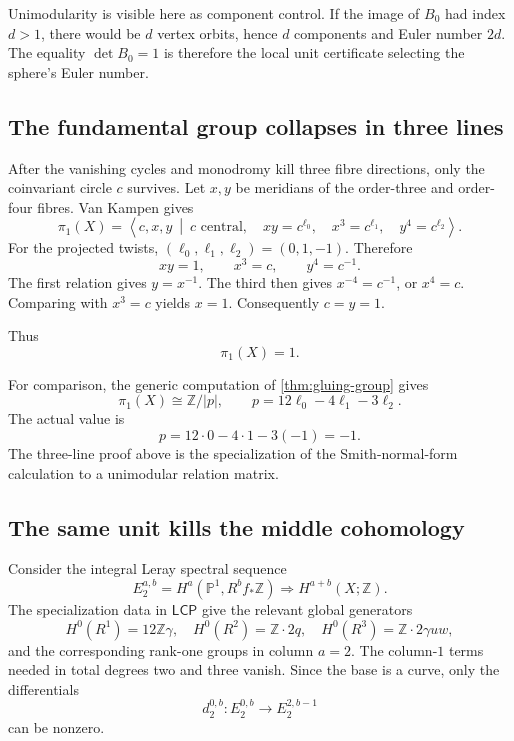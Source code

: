 \documentclass[11pt,reqno]{amsart}
\numberwithin{equation}{section}
\newcommand{\Z}{\mathbb Z}
\newcommand{\Pone}{\mathbb P^1}
\newcommand{\LCP}{\mathsf{LCP}}
\theoremstyle{definition}
\begin{document}
Unimodularity is visible here as component control. If the image of $B_0$ had index $d>1$, there would be $d$ vertex orbits, hence $d$ components and Euler number $2d$. The equality $\det B_0=1$ is therefore the local unit certificate selecting the sphere's Euler number.

\subsection{The fundamental group collapses in three lines}\label{sec:pi1}

After the vanishing cycles and monodromy kill three fibre directions, only the coinvariant circle $c$ survives. Let $x,y$ be meridians of the order-three and order-four fibres. Van Kampen gives
\begin{equation}\label{eq:presentation}
\pi_1(X)=
\left\langle c,x,y\ \middle|\
 c\text{ central},\quad
 xy=c^{\ell_0},\quad
 x^3=c^{\ell_1},\quad
 y^4=c^{\ell_2}
\right\rangle.
\end{equation}
For the projected twists, $(\ell_0,\ell_1,\ell_2)=(0,1,-1)$. Therefore
\[
xy=1,
\qquad x^3=c,
\qquad y^4=c^{-1}.
\]
The first relation gives $y=x^{-1}$. The third then gives $x^{-4}=c^{-1}$, or $x^4=c$. Comparing with $x^3=c$ yields $x=1$. Consequently $c=y=1$.

Thus
\begin{equation}\label{eq:pi1trivial}
\pi_1(X)=1.
\end{equation}

For comparison, the generic computation of \cref{thm:gluing-group} gives
\[
\pi_1(X)\cong\Z/|p|,
\qquad
p=12\ell_0-4\ell_1-3\ell_2.
\]
The actual value is
\begin{equation}\label{eq:pminusone}
p=12\cdot0-4\cdot1-3(-1)=-1.
\end{equation}
The three-line proof above is the specialization of the Smith-normal-form calculation to a unimodular relation matrix.

\subsection{The same unit kills the middle cohomology}\label{sec:cohomology}

Consider the integral Leray spectral sequence
\[
E_2^{a,b}=H^a(\Pone,R^bf_*\Z)\Longrightarrow H^{a+b}(X;\Z).
\]
The specialization data in $\LCP$ give the relevant global generators
\[
H^0(R^1)=12\Z\gamma,
\quad
H^0(R^2)=\Z\cdot2q,
\quad
H^0(R^3)=\Z\cdot2\gamma uw,
\]
and the corresponding rank-one groups in column $a=2$. The column-$1$ terms needed in total degrees two and three vanish. Since the base is a curve, only the differentials
\[
d_2^{0,b}:E_2^{0,b}\longrightarrow E_2^{2,b-1}
\]
can be nonzero.
\end{document}
